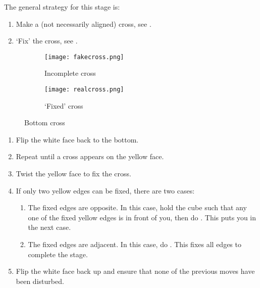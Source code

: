 The general strategy for this stage is:\begin{enumerate}
	\item Make a (not necessarily aligned) cross, see .
	\item `Fix' the cross, see .
\end{enumerate}
\begin{figure}[h]
	\centering
	\begin{subfigure}[b]{0.3\textwidth}
		\texttt{[image: fakecross.png]}
		\caption{Incomplete cross}\label{fig:fakecross}
	\end{subfigure}
	\begin{subfigure}[b]{0.3\textwidth}
		\texttt{[image: realcross.png]}
		\caption{`Fixed' cross}\label{fig:realcross}
	\end{subfigure}
	\caption{Bottom cross}
\end{figure}

\begin{enumerate}
	\item Flip the white face back to the bottom.
	\item Repeat  until a cross appears on the yellow face.
	\item Twist the yellow face to fix the cross.
	\item If only two yellow edges can be fixed, there are two cases:\begin{enumerate}
		\item The fixed edges are opposite. In this case, hold the cube such that any one of the fixed yellow edges is in front of you, then do . This puts you in the next case.
		\item The fixed edges are adjacent. In this case, do . This fixes all edges to complete the stage.
	\end{enumerate}
	\item Flip the white face back up and ensure that none of the previous moves have been disturbed.
\end{enumerate}